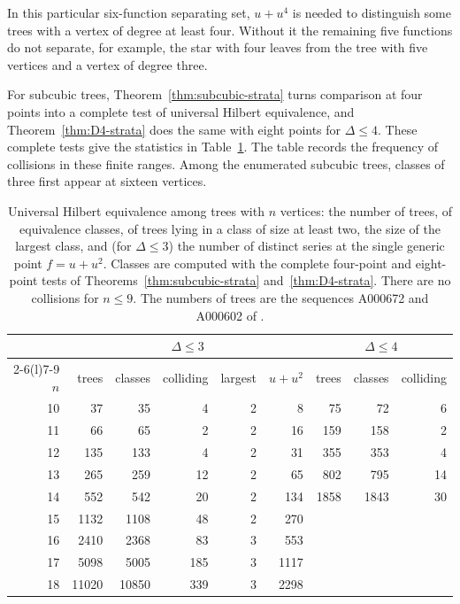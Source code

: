 \documentclass[reqno]{article}
\theoremstyle{plain} %
\theoremstyle{definition}
\theoremstyle{remark}
\numberwithin{equation}{section}
\begin{document}
In this particular six-function separating set, $u+u^4$ is needed
to distinguish some trees with a vertex of degree at least four. Without it the remaining five functions do not separate, for
example, the star with four leaves from the tree with five vertices and
a vertex of degree three.

For subcubic trees, Theorem~\ref{thm:subcubic-strata} turns comparison at
four points into a complete test of universal Hilbert equivalence, and
Theorem~\ref{thm:D4-strata} does the same with eight points for
$\Delta\le4$. These complete tests give the statistics in
Table~\ref{tab:collision-stats}.
The table records the frequency of collisions in these finite ranges.
Among the enumerated subcubic trees, classes of three first appear at
sixteen vertices.

\begin{table}[htbp]
\centering\renewcommand{\arraystretch}{1.12}\small
\begin{tabular}{r@{\quad}rrrrr@{\qquad}rrr}\toprule
&\multicolumn{5}{c}{$\Delta\le3$}&\multicolumn{3}{c}{$\Delta\le4$}\\
\cmidrule(lr){2-6}\cmidrule(l){7-9}
$n$ & trees & classes & colliding & largest & $u+u^2$ & trees & classes & colliding\\\midrule
10 & 37 & 35 & 4 & 2 & 8 & 75 & 72 & 6\\
11 & 66 & 65 & 2 & 2 & 16 & 159 & 158 & 2\\
12 & 135 & 133 & 4 & 2 & 31 & 355 & 353 & 4\\
13 & 265 & 259 & 12 & 2 & 65 & 802 & 795 & 14\\
14 & 552 & 542 & 20 & 2 & 134 & 1858 & 1843 & 30\\
15 & 1132 & 1108 & 48 & 2 & 270 &&&\\
16 & 2410 & 2368 & 83 & 3 & 553 &&&\\
17 & 5098 & 5005 & 185 & 3 & 1117 &&&\\
18 & 11020 & 10850 & 339 & 3 & 2298 &&&\\\bottomrule
\end{tabular}
\caption{Universal Hilbert equivalence among trees with $n$ vertices:
the number of trees, of equivalence classes, of trees lying in a class of
size at least two, the size of the largest class, and (for $\Delta\le3$)
the number of distinct series at the single generic point $f=u+u^2$.
Classes are computed with the complete four-point and eight-point tests of
Theorems~\ref{thm:subcubic-strata} and~\ref{thm:D4-strata}. There are no
collisions for $n\le9$. The numbers of trees are the sequences A000672
and A000602 of \cite{OEIS}.}
\label{tab:collision-stats}


\end{table}
\end{document}
